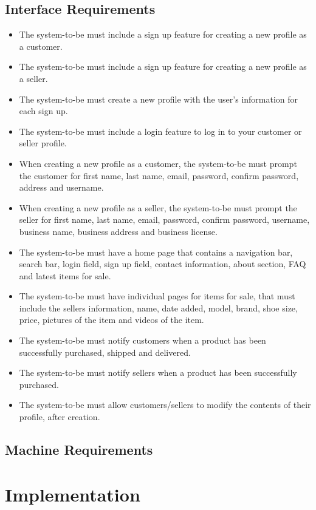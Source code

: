 \subsection{Interface Requirements}
\begin{itemize}
    \item The system-to-be must include a sign up feature for creating a new profile as a customer.
    \item The system-to-be must include a sign up feature for creating a new profile as a seller.
    \item The system-to-be must create a new profile with the user's information for each sign up.
    \item The system-to-be must include a login feature to log in to your customer or seller profile.
    \item When creating a new profile as a customer, the system-to-be must prompt the customer for first name, last name, email, password, confirm password, address and username.
    \item When creating a new profile as a seller, the system-to-be must prompt the seller for first name, last name, email, password, confirm password, username, business name, business address and business license.
    \item The system-to-be must have a home page that contains a navigation bar, search bar, login field, sign up field, contact information, about section, FAQ and latest items for sale.
    \item The system-to-be must have individual pages for items for sale, that must include the sellers information, name, date added, model, brand, shoe size, price, pictures of the item and videos of the item.
    \item The system-to-be must notify customers when a product has been successfully purchased, shipped and delivered.
    \item The system-to-be must notify sellers when a product has been successfully purchased.
    \item The system-to-be must allow customers/sellers to modify the contents of their profile, after creation.
\end{itemize}
\subsection{Machine Requirements}
\section{Implementation}
